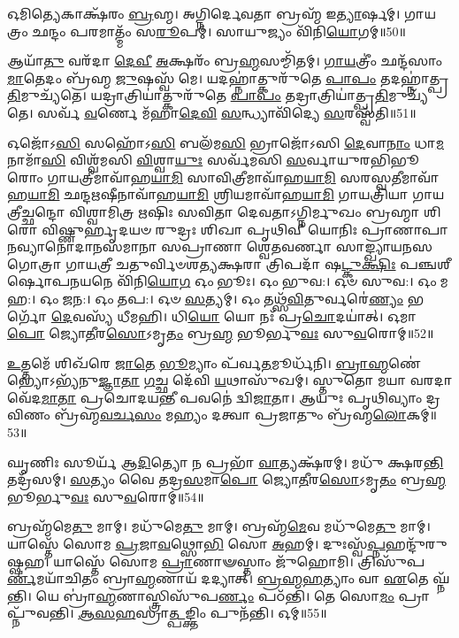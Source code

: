 𑌓𑌮𑌿𑌤𑍍𑌯𑍇𑌕𑌾𑌕𑍍𑌷᳴𑌰𑌂 \ul{𑌬𑍍𑌰}\-𑌹𑍍𑌮। 
𑌅𑌗𑍍𑌨𑌿𑌰𑍍𑌦𑍇𑌵𑌤𑌾 𑌬𑍍𑌰𑌹𑍍𑌮᳴ 𑌇\-\ul{𑌤𑍍𑌯𑌾}\-𑌰𑍍\mbox{}𑌷𑌮𑍍। 
𑌗𑌾𑌯𑌤𑍍𑌰𑌂 𑌛𑌨𑍍𑌦𑌂 𑌪𑌰𑌮𑌾𑌤𑍍𑌮𑌂᳴ 𑌸\-\ul{𑌰𑍂}\-𑌪𑌮𑍍। 
𑌸𑌾𑌯𑍁𑌜𑍍𑌯𑌂 𑌵𑌿᳴𑌨𑌿\-\ul{𑌯𑍋}\-𑌗𑌮𑍍॥50॥
\anuvakamend

𑌆𑌯𑌾᳴\-\ul{𑌤𑍁} 𑌵𑌰᳴𑌦𑌾 \ul{𑌦𑍇}\-\-\ul{𑌵𑍀} \ul{𑌅}\-𑌕𑍍𑌷𑌰𑌂᳴ 𑌬𑍍𑌰\-\ul{𑌹𑍍𑌮}\-𑌸𑌮𑍍𑌮𑌿᳴𑌤𑌮𑍍। 
\-\ul{𑌗𑌾}\-\-\ul{𑌯}\-𑌤𑍍𑌰𑍀𑌂॑ 𑌛𑌨𑍍𑌦᳴𑌸𑌾𑌂 \ul{𑌮𑌾}\-𑌤𑍇𑌦𑌂 𑌬𑍍𑌰᳴𑌹𑍍𑌮 \ul{𑌜𑍁}\-𑌷𑌸𑍍𑌵᳴ 𑌮𑍇। 
𑌯𑌦𑌹𑍍𑌨𑌾॑𑌤𑍍𑌕𑍁𑌰𑍁᳴𑌤𑍇 \ul{𑌪𑌾}\-\-\ul{𑌪𑌂} 𑌤𑌦𑌹𑍍𑌨𑌾॑𑌤𑍍𑌪𑍍𑌰\-\ul{𑌤𑌿}\-𑌮𑍁𑌚𑍍𑌯᳴𑌤𑍇। 
𑌯𑌦𑍍𑌰𑌾𑌤𑍍𑌰𑌿𑌯𑌾॑𑌤𑍍𑌕𑍁𑌰𑍁᳴𑌤𑍇 \ul{𑌪𑌾}\-\-\ul{𑌪𑌂} 𑌤𑌦𑍍𑌰𑌾𑌤𑍍𑌰𑌿𑌯𑌾॑𑌤𑍍𑌪𑍍𑌰\-\ul{𑌤𑌿}\-𑌮𑍁𑌚𑍍𑌯᳴𑌤𑍇। 
𑌸𑌰𑍍𑌵᳴ \ul{𑌵}\-𑌰𑍍𑌣𑍇 𑌮᳴𑌹𑌾\-\ul{𑌦𑍇}\-\-\ul{𑌵𑌿} \ul{𑌸}\-𑌨𑍍𑌧𑍍𑌯𑌾𑌵𑌿᳴𑌦𑍍𑌯𑍇 \ul{𑌸}\-𑌰𑌸𑍍𑌵᳴𑌤𑌿॥51॥ 
\anuvakamend

𑌓𑌜𑍋᳴𑌽\-\ul{𑌸𑌿} 𑌸𑌹𑍋᳴𑌽\-\ul{𑌸𑌿} 𑌬𑌲᳴𑌮\-\ul{𑌸𑌿} 𑌭𑍍𑌰𑌾𑌜𑍋᳴𑌽𑌸𑌿 \ul{𑌦𑍇}\-𑌵𑌾\-\ul{𑌨𑌾𑌂} 𑌧𑌾\-\ul{𑌮} 𑌨𑌾𑌮𑌾᳴\-\ul{𑌸𑌿} 𑌵𑌿𑌶𑍍𑌵᳴𑌮𑌸𑌿 \ul{𑌵𑌿}\-𑌶𑍍𑌵𑌾\-\ul{𑌯𑍁𑌃} 𑌸𑌰𑍍𑌵᳴𑌮𑌸𑌿 \ul{𑌸}\-𑌰𑍍𑌵𑌾𑌯𑍁𑌰𑌭𑌿𑌭𑍂𑌰𑍋𑌂 𑌗𑌾𑌯𑌤𑍍𑌰𑍀𑌮𑌾𑌵𑌾᳴𑌹\-\ul{𑌯𑌾}\-\-\ul{𑌮𑌿} 𑌸𑌾𑌵𑌿𑌤𑍍𑌰𑍀𑌮𑌾𑌵𑌾᳴𑌹\-\ul{𑌯𑌾}\-\-\ul{𑌮𑌿} 𑌸𑌰𑌸𑍍𑌵𑌤𑍀𑌮𑌾𑌵𑌾᳴𑌹\-\-\ul{𑌯𑌾}\-\-\ul{𑌮𑌿} 𑌛𑌨𑍍𑌦𑌋𑌷𑍀𑌨𑌾𑌵𑌾᳴𑌹\-\ul{𑌯𑌾}\-\-\ul{𑌮𑌿} 𑌶𑍍𑌰𑌿𑌯𑌮𑌾𑌵𑌾᳴𑌹\-\ul{𑌯𑌾}\-\-\ul{𑌮𑌿} 𑌗𑌾𑌯𑌤𑍍𑌰𑌿𑌯𑌾 𑌗𑌾𑌯𑌤𑍍𑌰𑍀𑌚𑍍𑌛𑌨𑍍𑌦𑍋 𑌵𑌿𑌶𑍍𑌵𑌾𑌮𑌿𑌤𑍍𑌰 𑌋𑌷𑌿𑌃 𑌸𑌵𑌿𑌤𑌾 𑌦𑍇𑌵𑌤𑌾𑌽𑌗𑍍𑌨𑌿𑌰𑍍𑌮𑍁𑌖𑌂 𑌬𑍍𑌰𑌹𑍍𑌮𑌾 𑌶𑌿𑌰𑍋 𑌵𑌿𑌷𑍍𑌣𑍁𑌰𑍍\mbox{}𑌹𑍃𑌦𑌯𑍞 𑌰𑍁𑌦𑍍𑌰𑌃 𑌶𑌿𑌖𑌾 𑌪𑍃𑌥𑌿𑌵𑍀 𑌯𑍋𑌨𑌿𑌃 𑌪𑍍𑌰𑌾𑌣𑌾𑌪𑌾𑌨𑌵𑍍𑌯𑌾𑌨𑍋𑌦𑌾𑌨𑌸𑌮𑌾𑌨𑌾 𑌸𑌪𑍍𑌰𑌾𑌣𑌾 𑌶𑍍𑌵𑍇𑌤𑌵𑌰𑍍𑌣𑌾 𑌸𑌾𑌙𑍍𑌖𑍍𑌯𑌾𑌯𑌨𑌸𑌗𑍋𑌤𑍍𑌰𑌾 𑌗𑌾𑌯𑌤𑍍𑌰𑍀 𑌚𑌤𑍁𑌰𑍍𑌵𑌿𑍞𑌶𑌤𑍍𑌯𑌕𑍍𑌷𑌰𑌾 𑌤𑍍𑌰𑌿𑌪𑌦𑌾᳴ 𑌷\-\ul{𑌟𑍍𑌕𑍁}\-\-\ul{𑌕𑍍𑌷𑌿𑌃} 𑌪𑌞𑍍𑌚𑌶𑍀𑌰𑍍\mbox{}𑌷𑍋𑌪𑌨𑌯𑌨𑍇 𑌵𑌿᳴𑌨𑌿\-\ul{𑌯𑍋}\-\-\ul{𑌗} 𑌓𑌂 𑌭𑍂𑌃। 
𑌓𑌂 𑌭𑍁𑌵:। 
𑌓𑍞 𑌸𑍁𑌵:। 
𑌓𑌂 𑌮𑌹:। 
𑌓𑌂 𑌜𑌨:। 
𑌓𑌂 𑌤𑌪:। 
𑌓𑍞 \ul{𑌸}\-𑌤𑍍𑌯𑌮𑍍। 
𑌓𑌂 𑌤𑌥𑍍𑌸᳴\-\ul{𑌵𑌿}\-𑌤𑍁𑌰𑍍𑌵𑌰𑍇॑\-\ul{𑌣𑍍𑌯𑌂} 𑌭𑌰𑍍𑌗𑍋᳴ \ul{𑌦𑍇}\-𑌵𑌸𑍍𑌯᳴ 𑌧𑍀𑌮𑌹𑌿। 
𑌧𑌿\-\ul{𑌯𑍋} 𑌯𑍋 𑌨𑌃᳴ 𑌪𑍍𑌰\-\ul{𑌚𑍋}\-𑌦𑌯𑌾॑𑌤𑍍। 
𑌓𑌮𑌾\-\ul{𑌪𑍋} 𑌜𑍍𑌯𑍋\-\ul{𑌤𑍀}\-𑌰\-\ul{𑌸𑍋}\-𑌽𑌮𑍃\-\ul{𑌤𑌂} 𑌬𑍍𑌰\-\ul{𑌹𑍍𑌮} 𑌭𑍂𑌰𑍍𑌭𑍁\-\ul{𑌵𑌃} 𑌸𑍁\-\ul{𑌵}\-𑌰𑍋𑌮𑍍॥52॥
\anuvakamend

\-\ul{𑌉}\-𑌤𑍍𑌤𑌮𑍇᳴ 𑌶𑌿𑌖᳴𑌰𑍇 \ul{𑌜𑌾}\-\-\ul{𑌤𑍇} \ul{𑌭𑍂}\-𑌮𑍍𑌯𑌾𑌂 𑌪᳴𑌰𑍍𑌵\-\ul{𑌤}\-𑌮𑍂𑌰𑍍𑌧᳴𑌨𑌿। 
\-\ul{𑌬𑍍𑌰𑌾}\-\-\ul{𑌹𑍍𑌮}\-𑌣𑍇॑𑌭𑍍𑌯𑍋𑌽𑌭𑍍𑌯᳴𑌨𑍁\-\-\ul{𑌜𑍍𑌞𑌾}\-\-\ul{𑌤𑌾} \ul{𑌗}\-𑌚𑍍𑌛 𑌦𑍇᳴𑌵𑌿 \ul{𑌯}\-𑌥𑌾𑌸𑍁᳴𑌖𑌮𑍍। 
𑌸𑍍𑌤𑍁𑌤𑍋 𑌮𑌯𑌾 𑌵𑌰𑌦𑌾 𑌵𑍇᳴𑌦\-\ul{𑌮𑌾}\-\-\ul{𑌤𑌾} 𑌪𑍍𑌰𑌚𑍋𑌦𑌯𑌨𑍍𑌤𑍀 𑌪𑌵𑌨𑍇॑ 𑌦𑍍𑌵𑌿\-\ul{𑌜𑌾}\-𑌤𑌾। 
𑌆𑌯𑍁𑌃 𑌪𑍃𑌥𑌿𑌵𑍍𑌯𑌾𑌂 𑌦𑍍𑌰𑌵𑌿𑌣𑌂 𑌬𑍍𑌰᳴𑌹𑍍𑌮\-\ul{𑌵}\-\-\ul{𑌰𑍍𑌚}\-\-\ul{𑌸𑌂} 𑌮𑌹𑍍𑌯𑌂 𑌦𑌤𑍍𑌵𑌾 𑌪𑍍𑌰𑌜𑌾𑌤𑍁𑌂 𑌬𑍍𑌰᳴𑌹𑍍𑌮\-\ul{𑌲𑍋}\-𑌕𑌮𑍍॥53॥
\anuvakamend

𑌘𑍃𑌣𑌿𑌃 𑌸𑍂𑌰𑍍𑌯᳴ 𑌆\-\ul{𑌦𑌿}\-𑌤𑍍𑌯𑍋 𑌨 𑌪𑍍𑌰𑌭𑌾᳴ \ul{𑌵𑌾}\-𑌤𑍍𑌯𑌕𑍍𑌷᳴𑌰𑌮𑍍। 
𑌮𑌧𑍁᳴ 𑌕𑍍𑌷𑌰\-\ul{𑌨𑍍𑌤𑌿} 𑌤𑌦𑍍𑌰᳴𑌸𑌮𑍍। 
\-\ul{𑌸}\-𑌤𑍍𑌯𑌂 𑌵𑍈 𑌤𑌦𑍍𑌰\-\ul{𑌸}\-𑌮𑌾\-\ul{𑌪𑍋} 𑌜𑍍𑌯𑍋\-\ul{𑌤𑍀}\-𑌰\-\ul{𑌸𑍋}\-𑌽𑌮𑍃\-\ul{𑌤𑌂} 𑌬𑍍𑌰\-\ul{𑌹𑍍𑌮} 𑌭𑍂𑌰𑍍𑌭𑍁\-\ul{𑌵𑌃} 𑌸𑍁\-\ul{𑌵}\-𑌰𑍋𑌮𑍍॥54॥\anuvakamend

𑌬𑍍𑌰𑌹𑍍𑌮᳴𑌮𑍇\-\ul{𑌤𑍁} 𑌮𑌾𑌮𑍍। 
𑌮𑌧𑍁᳴𑌮𑍇\-\ul{𑌤𑍁} 𑌮𑌾𑌮𑍍। 
𑌬𑍍𑌰𑌹𑍍𑌮᳴\-\ul{𑌮𑍇}\-𑌵 𑌮𑌧𑍁᳴𑌮𑍇\-\ul{𑌤𑍁} 𑌮𑌾𑌮𑍍। 
𑌯𑌾𑌸𑍍𑌤𑍇᳴ 𑌸𑍋𑌮 \ul{𑌪𑍍𑌰}\-𑌜𑌾\-\ul{𑌵}\-𑌥𑍍𑌸𑍋\-\ul{𑌭𑌿} 𑌸𑍋 \ul{𑌅}\-𑌹𑌮𑍍। 
𑌦𑍁𑌃𑌸𑍍𑌵᳴\-\ul{𑌪𑍍𑌨}\-𑌹𑌨𑍍𑌦𑍁᳴𑌰𑍁𑌷𑍍𑌷𑌹। 
𑌯𑌾𑌸𑍍𑌤𑍇᳴ 𑌸𑍋𑌮 \ul{𑌪𑍍𑌰𑌾}\-𑌣𑌾𑍟𑌸𑍍𑌤𑌾𑌂 𑌜𑍁᳴𑌹𑍋𑌮𑌿। 
𑌤𑍍𑌰𑌿𑌸𑍁᳴𑌪\-\ul{𑌰𑍍𑌣}\-𑌮𑌯𑌾᳴𑌚𑌿𑌤𑌂 𑌬𑍍𑌰𑌾\-\ul{𑌹𑍍𑌮}\-𑌣𑌾𑌯᳴ 𑌦𑌦𑍍𑌯𑌾𑌤𑍍। 
\-\ul{𑌬𑍍𑌰}\-\-\ul{𑌹𑍍𑌮}\-\-\ul{𑌹}\-𑌤𑍍𑌯𑌾𑌂 𑌵𑌾 \ul{𑌏}\-𑌤𑍇 𑌘𑍍𑌨᳴𑌨𑍍𑌤𑌿। 
𑌯𑍇 𑌬𑍍𑌰𑌾॑\-\ul{𑌹𑍍𑌮}\-𑌣𑌾𑌸𑍍𑌤𑍍𑌰𑌿𑌸𑍁᳴𑌪\-\ul{𑌰𑍍𑌣𑌂} 𑌪𑌠᳴𑌨𑍍𑌤𑌿। 
𑌤𑍇 𑌸𑍋\-\ul{𑌮𑌂} 𑌪𑍍𑌰𑌾𑌪𑍍𑌨𑍁᳴𑌵𑌨𑍍𑌤𑌿। 
\-\ul{𑌆}\-\-\ul{𑌸}\-\-\ul{𑌹}\-𑌸𑍍𑌰𑌾\-\ul{𑌤𑍍𑌪}\-𑌙𑍍𑌕𑍍𑌤𑌿𑌂 𑌪𑍁𑌨᳴𑌨𑍍𑌤𑌿। 
𑌓𑌮𑍍॥55॥
\anuvakamend

